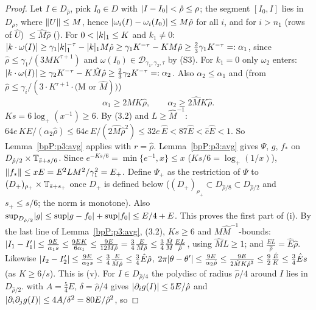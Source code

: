 \begin{proof}
\label{stepP:p3:st-nonres}
Let $I\in D_{\hat\rho}$, pick $I_0\in D$ with $\lvert I-I_0\rvert<\hat\rho\le\rho$; the segment $[I_0,I]$ lies in $D_\rho$, where $\lVert U\rVert\le M$, hence $\lvert \omega_i(I)-\omega_i(I_0)\rvert\le M\hat\rho$ for all $i$, and for $i>n_1$ (rows of $\hat U$) $\le\hat M\hat\rho$ ().
For $0<\lvert k\rvert_1\le K$ and $k_1\ne0$: $\lvert k\cdot\omega(I)\rvert\ge\gamma_1\lvert k\rvert_1^{-\tau}-\lvert k\rvert_1M\hat\rho\ge\gamma_1K^{-\tau}-KM\hat\rho\ge\frac23\gamma_1K^{-\tau}=:\alpha_1$, since $\hat\rho\le\gamma_1/(3MK^{\tau+1})$ and $\omega(I_0)\in\mathcal D_{\gamma_1,\gamma_2,\tau}$ by (S3).
For $k_1=0$ only $\omega_2$ enters: $\lvert k\cdot\omega(I)\rvert\ge\gamma_2K^{-\tau}-K\hat M\hat\rho\ge\frac23\gamma_2K^{-\tau}=:\alpha_2$. Also $\alpha_2\le\alpha_1$ and (from $\hat\rho\le\gamma_i/(3\cdot K^{\tau+1}\cdot\text{(M or }\hat M))$)
\[\alpha_1\ge2MK\hat\rho,\qquad\alpha_2\ge2\hat MK\hat\rho.\tag{3.2}\]
\label{stepP:p3:st-small}
$Ks=6\log_+(x^{-1})\ge6$. By (3.2) and $L\ge\hat M^{-1}$: $64e\,KE/(\alpha_2\hat\rho)\le64e\,E/(2\hat M\hat\rho^2)\le32e\,\hat E<87\hat E<\hat c\hat E<1$. So Lemma~\ref{bpP:p3:avg} applies with $r=\hat\rho$.
\label{stepP:p3:st-avg}
Lemma~\ref{bpP:p3:avg} gives $\Psi$, $g$, $f_*$ on $D_{\hat\rho/2}\times\mathbb{T}_{\bar s+s/6}$. Since $e^{-Ks/6}=\min\{e^{-1},x\}\le x$ ($Ks/6=\log_+(1/x)$),
$\lVert f_*\rVert\le xE=E^2LM^2/\gamma_1^2=E_+$. Define $\Psi_+$ as the restriction of $\Psi$ to $(D_+)_{\rho_+}\times\mathbb{T}_{\bar s+s_+}$ once $D_+$ is defined below ($(D_+)_{\rho_+}\subset D_{\hat\rho/8}\subset D_{\hat\rho/2}$ and $s_+\le s/6$; the norm is monotone). Also $\sup_{D_{\hat\rho/2}}\lvert g\rvert\le\sup\lvert g-f_0\rvert+\sup\lvert f_0\rvert\le E/4+E$. This proves the first part of (i).
\label{stepP:p3:st-disp}
By the last line of Lemma~\ref{bpP:p3:avg}, (3.2), $Ks\ge6$ and $M\hat M^{-1}$-bounds: $\lvert I_1-I_1'\rvert\le\frac{9E}{\alpha_1s}\le\frac{9E K}{6\alpha_1}\le\frac{9E}{12M\hat\rho}=\frac34\frac{E}{M\hat\rho}\le\frac34\frac{\hat M}{M}\frac{EL}{\hat\rho}$, using $\hat ML\ge1$; and $\frac{EL}{\hat\rho}=\hat E\hat\rho$. Likewise $\lvert I_2-I_2'\rvert\le\frac{9E}{\alpha_2s}\le\frac34\frac E{\hat M\hat\rho}\le\frac34\hat E\hat\rho$,
$2\pi\lvert \theta-\theta'\rvert\le\frac{9E}{\alpha_2\hat\rho}\le\frac{9E}{2\hat MK\hat\rho^2}\le\frac92\frac{\hat E}{K}\le\frac34\hat Es$ (as $K\ge6/s$). This is (v).
\label{stepP:p3:st-dg}
For $I\in D_{\hat\rho/4}$ the polydisc of radius $\hat\rho/4$ around $I$ lies in $D_{\hat\rho/2}$.  with $A=\frac54E$, $\delta=\hat\rho/4$ gives $\lvert \partial_ig(I)\rvert\le5E/\hat\rho$ and $\lvert \partial_i\partial_jg(I)\rvert\le4A/\delta^2=80E/\hat\rho^2$, so

\end{proof}
